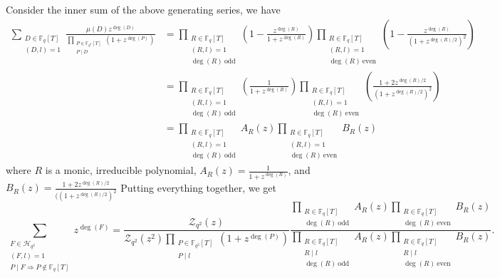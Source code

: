 \documentclass[table]{amsart}
\newcommand{\op}[1]{\operatorname{#1}}
\numberwithin{equation}{section}
\begin{document}
\noindent Consider the inner sum  of the above generating series, we have
\[\begin{split}
   \sum_{\substack{D \in \mathbb{F}_{q}[T] \\(D, l)=1}} \frac{\mu(D) z^{\op{deg}(D)}}{\prod_{\substack{P \in \mathbb{F}_{q^{2}}[T] \\ P \mid  D}}\left(1+z^{\operatorname{deg}(P)}\right)}&=\prod_{\substack{R\in \mathbb{F}_{q}[T] \\(R, l)=1 \\ \op{deg}(R)\ \text{odd}}}\left(1-\frac{z^{\deg(R)}}{1+z^{\deg(R)}}\right)\prod_{\substack{R\in \mathbb{F}_{q}[T] \\(R, l)=1 \\ \deg(R)\ \text{even}}}\left(1-\frac{z^{\deg(R)}}{(1+z^{\deg(R)/2})^2}\right)\\
   &=\prod_{\substack{R\in \mathbb{F}_{q}[T] \\(R, l)=1 \\ \deg(R)\ \text{odd}}}\left(\frac{1}{1+z^{\deg(R)}}\right)\prod_{\substack{R\in \mathbb{F}_{q}[T] \\(R, l)=1 \\ \deg(R)\ \text{even}}}\left(\frac{1+2z^{\deg(R)/2}}{(1+z^{\deg(R)/2})^2}\right)\\
&=\prod_{\substack{R\in \mathbb{F}_{q}[T] \\(R, l)=1 \\ \deg(R)\ \text{odd}}}A_R(z)\prod_{\substack{R\in \mathbb{F}_{q}[T] \\(R, l)=1 \\ \deg(R)\ \text{even}}}B_R(z)
 \end{split}\]
where  $R$ is a monic, irreducible polynomial, $A_R(z)=\frac{1}{1+z^{\deg(R)}}$, and $B_R(z)=\frac{1+2z^{\deg(R)/2}}{((1+z^{\deg(R)/2})^2}$
\noindent Putting everything together, we get
\begin{equation}\label{maineq 1}\sum_{\substack{F \in \mathcal{H}_{q^{2}} \\(F, l)=1 \\ P \mid F \Rightarrow P \notin \mathbb{F}_{q}[T]}} z^{\op{deg}(F)}=\frac{\mathcal{Z}_{q^{2}}(z)}{\mathcal{Z}_{q^{2}}\left(z^{2}\right) \prod_{\substack{P \in \mathbb{F}_{q^{2}}[T] \\ P \mid  l}}\left(1+z^{\operatorname{deg}(P)}\right)}\frac{\prod_{\substack{R\in \mathbb{F}_{q}[T]  \\ \deg(R)\ \text{odd}}}A_R(z)\prod_{\substack{R\in \mathbb{F}_{q}[T]\\ \op{deg}(R)\ \text{even}}}B_R(z)}{\prod_{\substack{R\in \mathbb{F}_{q}[T] \\R \mid l\\ \op{deg}(R)\ \text{odd}}}A_R(z)\prod_{\substack{R\in \mathbb{F}_{q}[T] \\ R \mid l \\ \op{deg}(R)\ \text{even}}}B_R(z)}.\end{equation}
\end{document}
